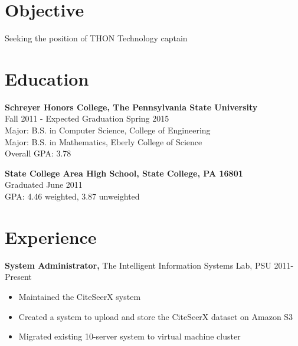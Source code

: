 \documentclass[margin]{res}
\begin{document}
 
\address{{\bf Present Address} \\ 664 East Prospect Avenue \\ Apartment D \\ State College, PA 16801 \\
        (814) 574-8768 }
\address{{\bf Permanent Address} \\ 3144 Williamsburg Court \\ State College, PA 16801 \\ (814) 574-0111 \\ douglasjordan0@gmail.com } 
\begin{resume} 
 
\section{Objective} 
Seeking the position of THON Technology captain

\section{Education} 
{\bf Schreyer Honors College, The Pennsylvania State University} \\
Fall 2011 - Expected Graduation Spring 2015 \\
Major: B.S. in Computer Science, College of Engineering \\
Major: B.S. in Mathematics, Eberly College of Science \\
Overall GPA: 3.78

{\bf State College Area High School, State College, PA 16801} \\
Graduated June 2011 \\
GPA: 4.46 weighted, 3.87 unweighted

\section{Experience}
{\bf System Administrator,} The Intelligent Information Systems Lab, PSU \hfill 2011-Present
\begin{itemize} \itemsep -2pt  %
\item Maintained the CiteSeerX system 
\item Created a system to upload and store the CiteSeerX dataset on Amazon S3
\item Migrated existing 10-server system to virtual machine cluster 
\end{itemize}
 

\end{resume}
\end{document}
